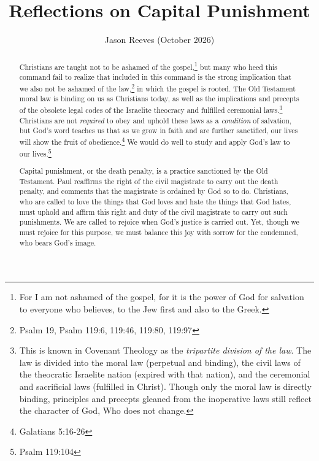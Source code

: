 

\title{Reflections on Capital Punishment}
\author{Jason Reeves (October 2026)}
\date{}



\ifdefined\embedversion
  \pagestyle{empty}
\fi

\maketitle
{}

\begin{abstract}
Christians are taught not to be ashamed of the gospel,\footnote{For I am not ashamed of the gospel, for it is the power of God for salvation to everyone who believes, to the Jew first and also to the Greek.} but many who heed this command fail to realize that included in this command is the strong implication that we also not be ashamed of the law,\footnote{Psalm 19, Psalm 119:6, 119:46, 119:80, 119:97} in which the gospel is rooted.  The Old Testament moral law is binding on us as Christians today, as well as the implications and precepts of the obsolete legal codes of the Israelite theocracy and fulfilled ceremonial laws.\footnote{This is known in Covenant Theology as the \textit{tripartite division of the law}.  The law is divided into the moral law (perpetual and binding), the civil laws of the theocratic Israelite nation (expired with that nation), and the ceremonial and sacrificial laws (fulfilled in Christ).  Though only the moral law is directly binding, principles and precepts gleaned from the inoperative laws still reflect the character of God, Who does not change.}  Christians are not \textit{required} to obey and uphold these laws as a \textit{condition} of salvation, but God's word teaches us that as we grow in faith and are further sanctified, our lives will show the fruit of obedience.\footnote{Galatians 5:16-26}  We would do well to study and apply God's law to our lives.\footnote{Psalm 119:104}

Capital punishment, or the death penalty, is a practice sanctioned by the Old Testament.  Paul reaffirms the right of the civil magistrate to carry out the death penalty, and comments that the magistrate is ordained by God so to do.  Christians, who are called to love the things that God loves and hate the things that God hates, must uphold and affirm this right and duty of the civil magistrate to carry out such punishments.  We are called to rejoice when God's justice is carried out.  Yet, though we must rejoice for this purpose, we must balance this joy with sorrow for the condemned, who bears God's image.
\end{abstract}

